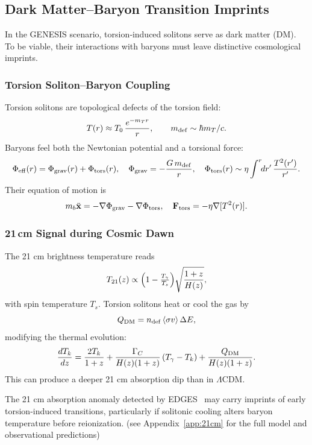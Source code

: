 \documentclass{article}
\begin{document}






\subsection{Dark Matter–Baryon Transition Imprints}
\label{subsec:dm_baryon_imprints}

In the GENESIS scenario, torsion‐induced solitons serve as dark matter (DM).
To be viable, their interactions with baryons must leave distinctive cosmological
imprints.

\subsubsection{ Torsion Soliton–Baryon Coupling}
Torsion solitons are topological defects of the torsion field:
\[
  T(r)\approx T_0\,\frac{e^{-m_Tr}}{r}, 
  \qquad m_{\rm def}\sim\hbar m_T/c.
\]
Baryons feel both the Newtonian potential and a torsional force:
\[
  \Phi_{\rm eff}(r)=\Phi_{\rm grav}(r)+\Phi_{\rm tors}(r),
  \quad
  \Phi_{\rm grav}=-\frac{G\,m_{\rm def}}{r}, 
  \quad
  \Phi_{\rm tors}(r)\sim\eta\int^r\!\!dr'\,\frac{T^2(r')}{r'}.
\]
Their equation of motion is
\[
  m_b\ddot{\mathbf x}
  = -\nabla\Phi_{\rm grav}
    -\nabla\Phi_{\rm tors},
  \quad
  \mathbf F_{\rm tors}=-\eta\nabla[T^2(r)].
\]

\subsubsection{ 21\,cm Signal during Cosmic Dawn}
The 21 cm brightness temperature reads
\[
  T_{21}(z)\propto\Bigl(1-\tfrac{T_\gamma}{T_s}\Bigr)
    \sqrt{\frac{1+z}{H(z)}},
\]
with spin temperature \(T_s\).  Torsion solitons heat or cool the gas by
\[
  Q_{\rm DM}
  = n_{\rm def}\,\langle\sigma v\rangle\,\Delta E,
\]
modifying the thermal evolution:
\[
  \frac{dT_k}{dz}
  = \frac{2T_k}{1+z}
    + \frac{\Gamma_C}{H(z)(1+z)}\,(T_\gamma - T_k)
    + \frac{Q_{\rm DM}}{H(z)(1+z)}.
\]
This can produce a deeper 21 cm absorption dip than in $\Lambda$CDM.

The 21 cm absorption anomaly detected by EDGES~\cite{bowman2018edges} may carry imprints of early torsion-induced transitions, particularly if solitonic cooling alters baryon temperature before reionization.
(see Appendix~\ref{app:21cm} for the full model and observational predictions)
\end{document}
